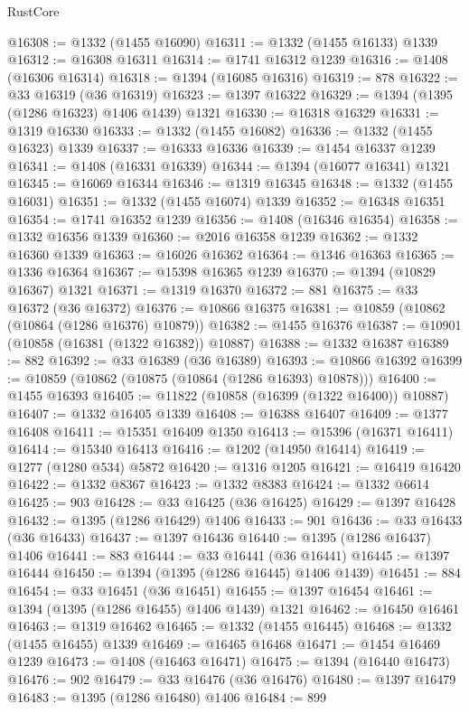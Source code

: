 \begin{lexlean}{RustCore}
\begin{coremodule}
@16308 := @1332 (@1455 @16090)
@16311 := @1332 (@1455 @16133) @1339
@16312 := @16308 @16311
@16314 := @1741 @16312 @1239
@16316 := @1408 (@16306 @16314)
@16318 := @1394 (@16085 @16316)
@16319 := 878
@16322 := @33 @16319 (@36 @16319)
@16323 := @1397 @16322
@16329 := @1394 (@1395 (@1286 @16323) @1406 @1439) @1321
@16330 := @16318 @16329
@16331 := @1319 @16330
@16333 := @1332 (@1455 @16082)
@16336 := @1332 (@1455 @16323) @1339
@16337 := @16333 @16336
@16339 := @1454 @16337 @1239
@16341 := @1408 (@16331 @16339)
@16344 := @1394 (@16077 @16341) @1321
@16345 := @16069 @16344
@16346 := @1319 @16345
@16348 := @1332 (@1455 @16031)
@16351 := @1332 (@1455 @16074) @1339
@16352 := @16348 @16351
@16354 := @1741 @16352 @1239
@16356 := @1408 (@16346 @16354)
@16358 := @1332 @16356 @1339
@16360 := @2016 @16358 @1239
@16362 := @1332 @16360 @1339
@16363 := @16026 @16362
@16364 := @1346 @16363
@16365 := @1336 @16364
@16367 := @15398 @16365 @1239
@16370 := @1394 (@10829 @16367) @1321
@16371 := @1319 @16370
@16372 := 881
@16375 := @33 @16372 (@36 @16372)
@16376 := @10866 @16375
@16381 := @10859 (@10862 (@10864 (@1286 @16376) @10879))
@16382 := @1455 @16376
@16387 := @10901 (@10858 (@16381 (@1322 @16382)) @10887)
@16388 := @1332 @16387
@16389 := 882
@16392 := @33 @16389 (@36 @16389)
@16393 := @10866 @16392
@16399 := @10859 (@10862 (@10875 (@10864 (@1286 @16393) @10878)))
@16400 := @1455 @16393
@16405 := @11822 (@10858 (@16399 (@1322 @16400)) @10887)
@16407 := @1332 @16405 @1339
@16408 := @16388 @16407
@16409 := @1377 @16408
@16411 := @15351 @16409 @1350
@16413 := @15396 (@16371 @16411)
@16414 := @15340 @16413
@16416 := @1202 (@14950 @16414)
@16419 := @1277 (@1280 @534) @5872
@16420 := @1316 @1205
@16421 := @16419 @16420
@16422 := @1332 @8367
@16423 := @1332 @8383
@16424 := @1332 @6614
@16425 := 903
@16428 := @33 @16425 (@36 @16425)
@16429 := @1397 @16428
@16432 := @1395 (@1286 @16429) @1406
@16433 := 901
@16436 := @33 @16433 (@36 @16433)
@16437 := @1397 @16436
@16440 := @1395 (@1286 @16437) @1406
@16441 := 883
@16444 := @33 @16441 (@36 @16441)
@16445 := @1397 @16444
@16450 := @1394 (@1395 (@1286 @16445) @1406 @1439)
@16451 := 884
@16454 := @33 @16451 (@36 @16451)
@16455 := @1397 @16454
@16461 := @1394 (@1395 (@1286 @16455) @1406 @1439) @1321
@16462 := @16450 @16461
@16463 := @1319 @16462
@16465 := @1332 (@1455 @16445)
@16468 := @1332 (@1455 @16455) @1339
@16469 := @16465 @16468
@16471 := @1454 @16469 @1239
@16473 := @1408 (@16463 @16471)
@16475 := @1394 (@16440 @16473)
@16476 := 902
@16479 := @33 @16476 (@36 @16476)
@16480 := @1397 @16479
@16483 := @1395 (@1286 @16480) @1406
@16484 := 899

\end{coremodule}
\end{lexlean}
